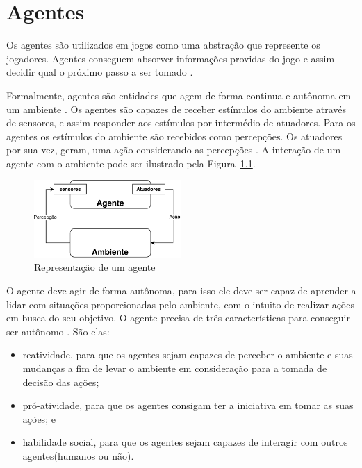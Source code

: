 \chapter{\label{chap:agentes}Agentes} 

Os agentes são utilizados em jogos como uma abstração que represente os jogadores. Agentes conseguem absorver informações providas do jogo e assim decidir qual o próximo passo a ser tomado \cite{millington2009artificial}. 

Formalmente, agentes são entidades que agem de forma continua e autônoma em um ambiente \cite{agent1993oriented}. 
Os agentes são capazes de receber estímulos do ambiente através de sensores, e assim responder aos estímulos por intermédio de atuadores. 
Para os agentes os estímulos do ambiente são recebidos como percepções. 
Os atuadores por sua vez, geram, uma ação considerando as percepções \cite{intelligence2003modern}. 
A interação de um agente com o ambiente pode ser ilustrado pela Figura~\ref{fig:agente}.


\begin{figure}[ht]
	\centering
	\includegraphics[width=0.5\textwidth]{fig/agente.pdf}
	\caption{Representação de um agente}
	\label{fig:agente}
\end{figure} 

O agente deve agir de forma autônoma, para isso ele deve ser capaz de aprender a lidar com situações proporcionadas pelo ambiente, com o intuito de realizar ações em busca do seu objetivo. O agente precisa de três características para conseguir ser autônomo \cite{agent1999}. São elas:
 
\begin{itemize}
	\item reatividade, para que os agentes sejam capazes de perceber o ambiente e suas mudanças a fim de levar o ambiente em consideração para a tomada de decisão das ações;
	\item pró-atividade, para que os agentes consigam ter a iniciativa em tomar as suas ações; e
	\item habilidade social, para que os agentes sejam capazes de interagir com outros agentes(humanos ou não).
\end{itemize}


